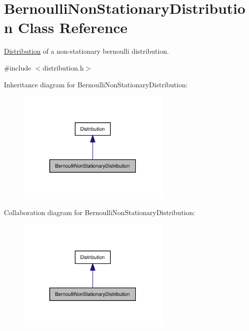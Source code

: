 \hypertarget{class_bernoulli_non_stationary_distribution}{}\section{Bernoulli\+Non\+Stationary\+Distribution Class Reference}
\label{class_bernoulli_non_stationary_distribution}


\mbox{\hyperlink{class_distribution}{Distribution}} of a non-\/stationary bernoulli distribution.  




{\ttfamily \#include $<$distribution.\+h$>$}



Inheritance diagram for Bernoulli\+Non\+Stationary\+Distribution\+:
\nopagebreak
\begin{figure}[H]
\begin{center}
\leavevmode
\includegraphics[width=211pt]{class_bernoulli_non_stationary_distribution__inherit__graph}
\end{center}
\end{figure}


Collaboration diagram for Bernoulli\+Non\+Stationary\+Distribution\+:
\nopagebreak
\begin{figure}[H]
\begin{center}
\leavevmode
\includegraphics[width=211pt]{class_bernoulli_non_stationary_distribution__coll__graph}
\end{center}
\end{figure}
